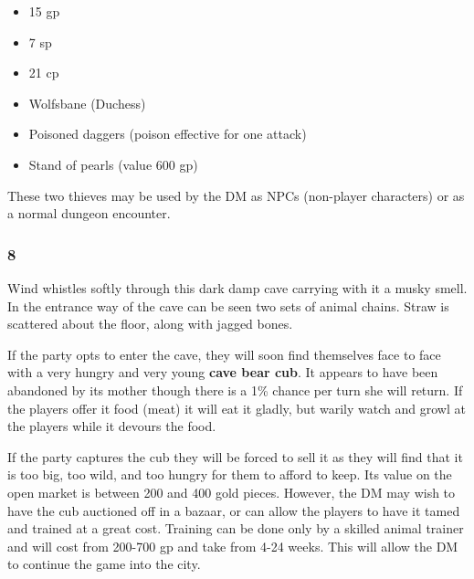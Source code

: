 \documentclass[palace_of_the_silver_princess]{subfiles}
\begin{document}
\begin{itemize}
    \item 15 gp
    \item 7 sp
    \item 21 cp
    \item Wolfsbane (Duchess)
    \item Poisoned daggers (poison effective for one attack)
    \item Stand of pearls (value 600 gp)
\end{itemize}

These two thieves may be used by the DM as NPCs (non-player characters)
or as a normal dungeon encounter.

\subsubsection{8}
\begin{quotebox}
    Wind whistles softly through this dark damp cave carrying with it a
    musky smell. In the entrance way of the cave can be seen two sets of
    animal chains. Straw is scattered about the floor, along with jagged
    bones.
\end{quotebox}

If the party opts to enter the cave, they will soon find themselves face
to face with a very hungry and very young \textbf{cave bear cub}.  It
appears to have been abandoned by its mother though there is a 1\%
chance per turn she will return. If the players offer it food (meat) it
will eat it gladly, but warily watch and growl at the players while it
devours the food.

If the party captures the cub they will be forced to sell it as they
will find that it is too big, too wild, and too hungry for them to
afford to keep. Its value on the open market is between 200 and 400 gold
pieces. However, the DM may wish to have the cub auctioned off in a
bazaar, or can allow the players to have it tamed and trained at a great
cost. Training can be done only by a skilled animal trainer and will
cost from 200-700 gp and take from 4-24 weeks. This will allow the DM to
continue the game into the city.
\end{document}
